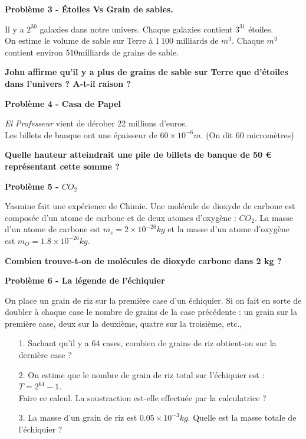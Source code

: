 \textbf{Problème 3 - Étoiles Vs Grain de sables.}

Il y a $2^{30}$ galaxies dans notre univers. Chaque galaxies contient $3^{31}$ étoiles.  \\
On estime le volume de sable sur Terre à $1\,100 \text{ milliards de } m^3$. Chaque $m^3$ contient environ $510 \text{milliards}$ de grains de sable. 

\textbf{John affirme qu'il y a plus de grains de sable sur Terre que d'étoiles dans l'univers ? A-t-il raison ?}

\Pointilles[5]

\textbf{Problème 4 - Casa de Papel}

\textit{\og El Professeur \fg{} } vient de dérober 22 millions d’euros. \\
Les billets de banque ont une épaisseur de $60 \times 10^{-6} m$. (On dit 60 micromètres)

\textbf{Quelle hauteur atteindrait une pile de billets de banque de 50 \euro{} représentant cette somme ?}

\Pointilles[6]

\textbf{Problème 5 - $CO_2$}

Yasmine fait une expérience de Chimie. Une molécule de dioxyde de carbone est composée d'un atome de carbone et de deux atomes d'oxygène : $CO_2$. La masse d'un atome de carbone est $ m_c = 2 \times 10^{-26}kg$ et la masse d'un atome d'oxygène est $ m_O = 1.8 \times 10^{-26}kg$. 

\textbf{Combien trouve-t-on de molécules de dioxyde carbone dans 2 kg ?}

\Pointilles[6]

\textbf{Problème 6 - La légende de l'échiquier}

\og On place un grain de riz sur la première case d'un échiquier. Si on fait en sorte de doubler à chaque case le nombre de grains de la case précédente : un grain sur la première case, deux sur la deuxième, quatre sur la troisième, etc.,

\begin{itemize}
    \item[1.] Sachant qu'il y a 64 cases, combien de grains de riz obtient-on sur la dernière case ? 
    \item[2.] On estime que le nombre de grain de riz total sur l'échiquier est : $T = 2^{64} - 1$. \\
    Faire ce calcul. La soustraction est-elle effectuée par la calculatrice ?
    \item[3.] La masse d'un grain de riz est $0.05 \times 10^{-3} kg$. Quelle est la masse totale de l'échiquier ? 
\end{itemize}

\Pointilles[10]


